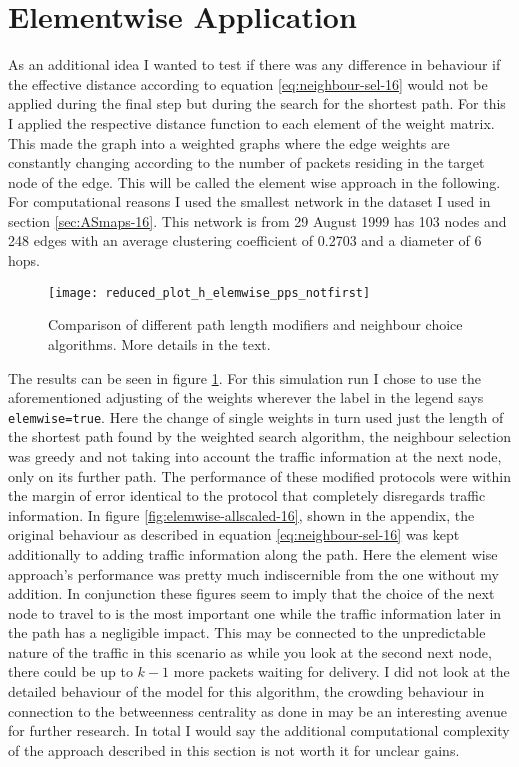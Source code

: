 \section{Elementwise Application}
As an additional idea I wanted to test if there was any difference in behaviour if the effective distance according to equation \ref{eq:neighbour-sel-16} would not be applied during the final step but during the search for the shortest path. For this I applied the respective distance function to each element of the weight matrix. This made the graph into a weighted graphs where the edge weights are constantly changing according to the number of packets residing in the target node of the edge. This will be called the element wise approach in the following.
For computational reasons I used the smallest network in the dataset I used in section \ref{sec:ASmaps-16}. This network is from 29 August 1999 has \num{103} nodes and \num{248} edges with an average clustering coefficient of \num{0.2703} and a diameter of \num{6} hops.

\begin{figure}[h]
	\centering
	\texttt{[image: reduced\_plot\_h\_elemwise\_pps\_notfirst]}
	\caption{Comparison of different path length modifiers and neighbour choice algorithms. More details in the text.}
	\label{fig:elemwise-16}
\end{figure}

The results can be seen in figure \ref{fig:elemwise-16}.
For this simulation run I chose to use the aforementioned adjusting of the weights wherever the label in the legend says \texttt{elemwise=true}.
Here the change of single weights in turn used just the length of the shortest path found by the weighted search algorithm, the neighbour selection was greedy and not taking into account the traffic information at the next node, only on its further path.
The performance of these modified protocols were within the margin of error identical to the protocol that completely disregards traffic information.
In figure \ref{fig:elemwise-allscaled-16}, shown in the appendix, the original behaviour as described in equation \ref{eq:neighbour-sel-16} was kept additionally to adding traffic information along the path.
Here the element wise approach's performance was pretty much indiscernible from the one without my addition.
In conjunction these figures seem to imply that the choice of the next node to travel to is the most important one while the traffic information later in the path has a negligible impact.
This may be connected to the unpredictable nature of the traffic in this scenario as while you look at the second next node, there could be up to $k-1$ more packets waiting for delivery.
I did not look at the detailed behaviour of the model for this algorithm, the crowding behaviour in connection to the betweenness centrality as done in \cite{Echenique2005} may be an interesting avenue for further research.
In total I would say the additional computational complexity of the approach described in this section is not worth it for unclear gains.

\newpage